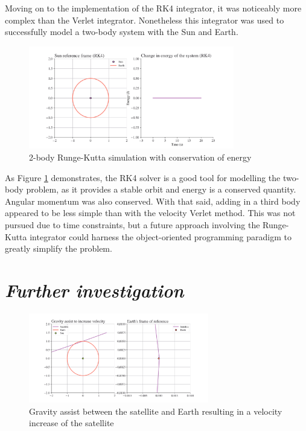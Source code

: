 \documentclass[11pt, english]{report}
\begin{document}
\normalsize{Moving on to the implementation of the RK4 integrator, it was noticeably more complex than the Verlet integrator. Nonetheless this integrator was used to successfully model a two-body system with the Sun and Earth.
\begin{figure}[ht]
    \centering
    \includegraphics[width=0.8\textwidth]{graphics/rk4.png}
    \caption{2-body Runge-Kutta simulation with conservation of energy}
    \label{fig:rk4}
\end{figure}
As Figure \ref{fig:rk4} demonstrates, the RK4 solver is a good tool for modelling the two-body problem, as it provides a stable orbit and energy is a conserved quantity. Angular momentum was also conserved. With that said, adding in a third body appeared to be less simple than with the velocity Verlet method. This was not pursued due to time constraints, but a future approach involving the Runge-Kutta integrator could harness the object-oriented programming paradigm to greatly simplify the problem.}

\section{\textsl{Further investigation}}

\begin{figure}[ht]
    \centering
    \includegraphics[width=0.7\textwidth]{graphics/earth_increase1.png}
    \caption{Gravity assist between the satellite and Earth resulting in a velocity increase of the satellite}
    \label{fig:earth_increase1.png}
\end{figure}
\end{document}
